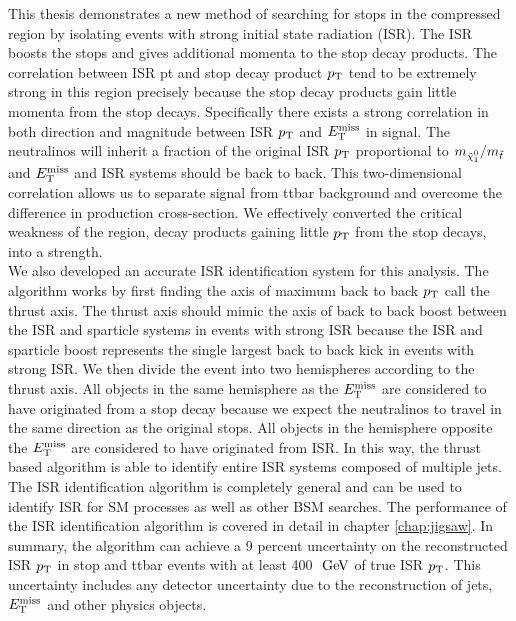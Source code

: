 \indent This thesis demonstrates a new method of searching for stops in the compressed region by isolating events with strong initial state radiation (ISR).  The ISR boosts the stops and gives additional momenta to the stop decay products.  The correlation between ISR pt and stop decay product $p_{\mathrm{T}}$ tend to be extremely strong in this region precisely because the stop decay products gain little momenta from the stop decays.  Specifically there exists a strong correlation in both direction and magnitude between ISR $p_{\mathrm{T}}$ and $E_{\mathrm{T}}^{\mathrm{miss}}$ in signal.  The neutralinos will inherit a fraction of the original ISR $p_{\mathrm{T}}$ proportional to  $m_{\ninoone}/m_{\stop}$ and $E_{\mathrm{T}}^{\mathrm{miss}}$ and ISR systems should be back to back.  This two-dimensional correlation allows us to separate signal from ttbar background and overcome the difference in production cross-section. We effectively converted the critical weakness of the region, decay products gaining little $p_{\mathrm{T}}$ from the stop decays, into a strength.  \\

\indent We also developed an accurate ISR identification system for this analysis.  The algorithm works by first finding the axis of maximum back to back $p_{\mathrm{T}}$ call the thrust axis.  The thrust axis should mimic the axis of back to back boost between the ISR and sparticle systems in events with strong ISR because the ISR and sparticle boost represents the single largest back to back kick in events with strong ISR.  We then divide the event into two hemispheres according to the thrust axis.  All objects in the same hemisphere as the $E_{\mathrm{T}}^{\mathrm{miss}}$ are considered to have originated from a stop decay because we expect the neutralinos to travel in the same direction as the original stops.  All objects in the hemisphere opposite the $E_{\mathrm{T}}^{\mathrm{miss}}$ are considered to have originated from ISR.  In this way, the thrust based algorithm is able to identify entire ISR systems composed of multiple jets.  \\ 

\indent The ISR identification algorithm is completely general and can be used to identify ISR for SM processes as well as other BSM searches.  The performance of the ISR identification algorithm is covered in detail in chapter \ref{chap:jigsaw}.  In summary, the algorithm can achieve a 9 percent uncertainty on the reconstructed ISR $p_{\mathrm{T}}$ in stop and ttbar events with at least 400 $\gev$ of true ISR $p_{\mathrm{T}}$. This uncertainty includes any detector uncertainty due to the reconstruction of jets, $E_{\mathrm{T}}^{\mathrm{miss}}$ and other physics objects.  \\

